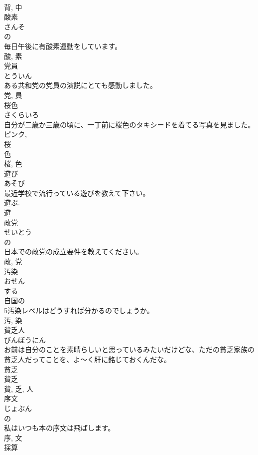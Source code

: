 \documentclass[8pt]{extreport}
\begin{document}
\begin{CJK}{UTF8}{min}
\\	背, 中	
\\	酸素	
\\	さんそ	
\\	の 
\\	毎日午後に有酸素運動をしています。	
\\	酸, 素	
\\	党員	
\\	とういん	
\\	ある共和党の党員の演説にとても感動しました。	
\\	党, 員	
\\	桜色	
\\	さくらいろ	
\\	自分が二歳か三歳の頃に、一丁前に桜色のタキシードを着てる写真を見ました。	
\\	ピンク, 
\\	桜 
\\	色 
\\	桜, 色	
\\	遊び	
\\	あそび	
\\	最近学校で流行っている遊びを教えて下さい。	
\\	遊ぶ. 
\\	遊	
\\	政党	
\\	せいとう	
\\	の 
\\	日本での政党の成立要件を教えてください。	
\\	政, 党	
\\	汚染	
\\	おせん	
\\	する 
\\	自国の
\\	5汚染レベルはどうすれば分かるのでしょうか。	
\\	汚, 染	
\\	貧乏人	
\\	びんぼうにん	
\\	お前は自分のことを素晴らしいと思っているみたいだけどな、ただの貧乏家族の貧乏人だってことを、よ〜く肝に銘じておくんだな。	
\\	貧乏 
\\	貧乏 
\\	貧, 乏, 人	
\\	序文	
\\	じょぶん	
\\	の 
\\	私はいつも本の序文は飛ばします。	
\\	序, 文	
\\	採算	

\end{CJK}
\end{document}
